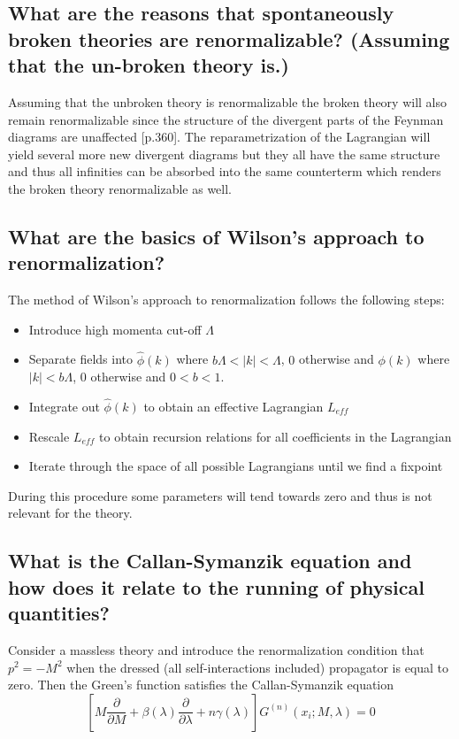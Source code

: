 \documentclass[paper=a4, fontsize=11pt]{scrartcl} %
\numberwithin{equation}{section} %
\numberwithin{figure}{section} %
\numberwithin{table}{section} %
\newcommand{\commutator}[1]{\ensuremath{\left[ #1 \right]}}
\begin{document}
\subsection{What are the reasons that spontaneously broken theories are renormalizable? (Assuming that the un-broken theory is.)}
Assuming that the unbroken theory is renormalizable the broken theory will also remain renormalizable since the structure of the divergent parts of the Feynman diagrams are unaffected [p.360]. The reparametrization of the Lagrangian will yield several more new divergent diagrams but they all have the same structure and thus all infinities can be absorbed into the same counterterm which renders the broken theory renormalizable as well.

\subsection{What are the basics of Wilson's approach to renormalization?}
The method of Wilson's approach to renormalization follows the following steps:

\begin{itemize}
  \item Introduce high momenta cut-off $\Lambda$
  \item Separate fields into $\hat{\phi}(k)$ where $b\Lambda < |k| < \Lambda$, $0$ otherwise and $\phi(k)$ where $|k|<b\Lambda$, $0$ otherwise and $0<b<1$.
  \item Integrate out  $\hat{\phi}(k)$ to obtain an effective Lagrangian $L_{eff}$
  \item Rescale $L_{eff}$ to obtain recursion relations for all coefficients in the Lagrangian
  \item Iterate through the space of all possible Lagrangians until we find a fixpoint
\end{itemize}
During this procedure some parameters will tend towards zero and thus is not relevant for the theory. 

\subsection{What is the Callan-Symanzik equation and how does it relate to the running of physical quantities?}
Consider a massless theory and introduce the renormalization condition that $p^2=-M^2$ when the dressed (all self-interactions included) propagator is equal to zero. Then the Green's function satisfies the Callan-Symanzik equation
\begin{equation}
\commutator{M \dfrac{\partial}{\partial M} + \beta(\lambda) \dfrac{\partial}{\partial \lambda} + n \gamma(\lambda)}G^{(n)}({x_i};M,\lambda)=0
\label{eq:Callan-Symanzik}
\end{equation} 
\end{document}
